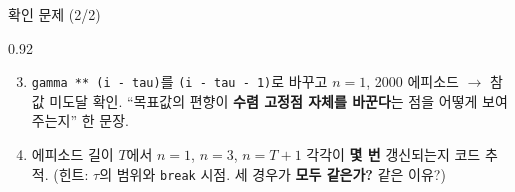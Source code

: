 \begin{frame}{확인 문제 (2/2)}
\begin{center}\begin{varwidth}{0.92\textwidth}
  \begin{enumerate}
    \setcounter{enumi}{2}
    \item {} \texttt{gamma ** (i - tau)}를
      \texttt{(i - tau - 1)}로 바꾸고 $n=1$, 2000 에피소드 $\to$ 참값
      미도달 확인. ``목표값의 편향이 \textbf{수렴 고정점 자체를
      바꾼다}는 점을 어떻게 보여주는지'' 한 문장.
    \item {} 에피소드 길이 $T$에서
      $n=1$, $n=3$, $n=T+1$ 각각이 \textbf{몇 번} 갱신되는지 코드
      추적. (힌트: $\tau$의 범위와 \texttt{break} 시점. 세 경우가
      \textbf{모두 같은가?} 같은 이유?)
  \end{enumerate}
\end{varwidth}\end{center}
\end{frame}
